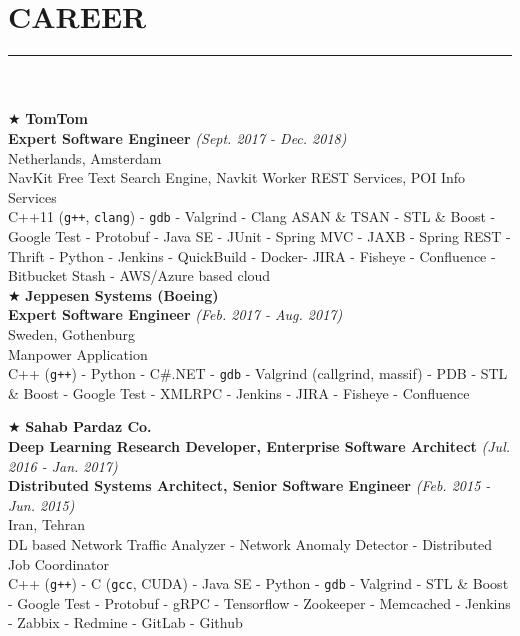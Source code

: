 \documentclass[10pt,a4paper]{article}
\begin{document}
\section{CAREER}
\noindent\rule {18.0cm}{0.2pt} \\ \\
$\bigstar$ \hspace{0.1cm} \large \textbf{TomTom} \\
\indent \small \textbf{Expert Software Engineer} \textsl{(Sept. 2017 - Dec. 2018)} \\
\indent \textnormal{Netherlands, Amsterdam} \\
\indent \textbullet \hspace{0.05cm} NavKit Free Text Search Engine, Navkit Worker REST Services, POI Info Services \\
\indent \textbullet \hspace{0.05cm} C++11 (\texttt{g++}, \texttt{clang}) - \texttt{gdb} - Valgrind - Clang ASAN \& TSAN - STL \& Boost - Google Test - Protobuf - Java SE - JUnit - Spring MVC - JAXB - Spring REST - Thrift - Python - Jenkins - QuickBuild - Docker- JIRA - Fisheye - Confluence - Bitbucket Stash - AWS/Azure based cloud \\

\noindent $\bigstar$ \hspace{0.1cm} \large \textbf{Jeppesen Systems (Boeing)} \\
\indent \small \textbf{Expert Software Engineer} \textsl{(Feb. 2017 - Aug. 2017)} \\
\indent \textnormal{Sweden, Gothenburg} \\
\indent \textbullet \hspace{0.05cm} Manpower Application \\
\indent \textbullet \hspace{0.05cm} C++ (\texttt{g++}) - Python - C\#.NET - \texttt{gdb} - Valgrind (callgrind, massif) - PDB - STL \& Boost - Google Test - XMLRPC - Jenkins - JIRA - Fisheye - Confluence

\break

\noindent $\bigstar$ \hspace{0.1cm} \large \textbf{Sahab Pardaz Co.} \\
\indent \small \textbf{Deep Learning Research Developer, Enterprise Software Architect} \textsl{(Jul. 2016 - Jan. 2017)} \\
\indent \small \textbf{Distributed Systems Architect, Senior Software Engineer} \textsl{(Feb. 2015 - Jun. 2015)} \\
\indent \textnormal{Iran, Tehran} \\
\indent \textbullet \hspace{0.05cm} DL based Network Traffic Analyzer - Network Anomaly Detector - Distributed Job Coordinator\\
\indent \textbullet \hspace{0.05cm} C++ (\texttt{g++}) - C (\texttt{gcc}, CUDA) - Java SE - Python - \texttt{gdb} - Valgrind - STL \& Boost - Google Test - Protobuf - gRPC - Tensorflow - Zookeeper - Memcached - Jenkins - Zabbix - Redmine - GitLab - Github \\
\end{document}
